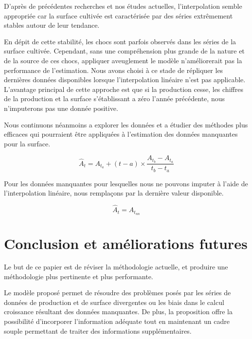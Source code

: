 \documentclass[nojss]{jss}\usepackage{graphicx, color}
\begin{document}
D'apr\`{e}s de pr\'{e}c\'{e}dentes recherches et nos \'{e}tudes
actuelles, l'interpolation semble appropri\'{e}e car la surface
cultiv\'{e}e est caract\'{e}ris\'{e}e par des s\'{e}ries extr\^{e}mement
stables autour de leur tendance.


En d\'{e}pit de cette stabilit\'{e}, les chocs sont parfois
observ\'{e}s dans les s\'{e}ries de la surface cultiv\'{e}e.
Cependant, sans une compr\'{e}hension plus grande de la nature et de
la source de ces chocs, appliquer aveuglement le mod\`{e}le
n'am\'{e}liorerait pas la performance de l'estimation. Nous avons
choisi \`{a} ce stade de r\'{e}pliquer les derni\`{e}res donn\'{e}es
disponibles lorsque l'interpolation lin\'{e}aire n'est pas
applicable. L'avantage principal de cette approche est que si la
production cesse, les chiffres de la production et la surface
s'\'{e}tablissant a z\'{e}ro l'ann\'{e}e pr\'{e}c\'{e}dente, nous
n'imputerons pas une donn\'{e}e positive.

Nous continuons n\'{e}anmoins a explorer les donn\'{e}es et a
\'{e}tudier des m\'{e}thodes plus efficaces qui pourraient être
appliqu\'{e}es \`{a} l'estimation des donn\'{e}es manquantes pour la
surface.

\begin{equation}
  \label{eq:linearInterpolation}
  \hat{A}_t = A_{t_a} + (t - a) \times \frac{A_{t_b} - A_{t_a}}{t_b - t_a}
\end{equation}

Pour les donn\'{e}es manquantes pour lesquelles nous ne pouvons
imputer \`{a} l'aide de l'interpolation lin\'{e}aire, nous rempla\c{c}ons
par la derni\`{e}re valeur disponible.

\begin{equation}
  \label{eq:locf}
  \hat{A}_t = A_{t_{nn}}
\end{equation}


\section{Conclusion et am\'{e}liorations futures}

Le but de ce papier est de r\'{e}viser la m\'{e}thodologie actuelle,
et produire une m\'{e}thodologie plus pertinente et plus performante.


Le mod\`{e}le propos\'{e} permet de r\'{e}soudre des probl\`{e}mes
pos\'{e}s par les s\'{e}ries de donn\'{e}es de production et de
surface divergentes ou les biais dans le calcul croissance
r\'{e}sultant des donn\'{e}es manquantes. De plus, la proposition
offre la possibilit\'{e} d'incorporer l'information ad\'{e}quate tout
en maintenant un cadre souple permettant de traiter des informations
suppl\'{e}mentaires.
\end{document}
